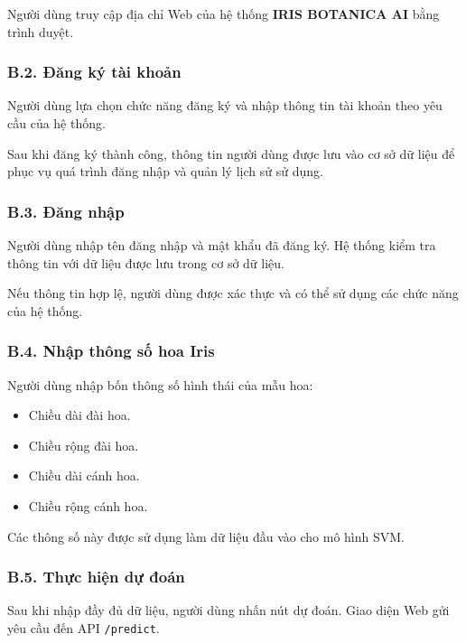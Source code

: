 \documentclass[14pt]{extarticle}
\begin{document}
	\noindent
	Người dùng truy cập địa chỉ Web của hệ thống
	\textbf{IRIS BOTANICA AI} bằng trình duyệt.
	
	\subsubsection*{B.2. Đăng ký tài khoản}
	
	\noindent
	Người dùng lựa chọn chức năng đăng ký và nhập thông tin tài khoản theo
	yêu cầu của hệ thống.
	
	\noindent
	Sau khi đăng ký thành công, thông tin người dùng được lưu vào cơ sở
	dữ liệu để phục vụ quá trình đăng nhập và quản lý lịch sử sử dụng.
	
	
	\subsubsection*{B.3. Đăng nhập}
	
	\noindent
	Người dùng nhập tên đăng nhập và mật khẩu đã đăng ký. Hệ thống kiểm tra
	thông tin với dữ liệu được lưu trong cơ sở dữ liệu.
	
	\noindent
	Nếu thông tin hợp lệ, người dùng được xác thực và có thể sử dụng các
	chức năng của hệ thống.
	
	\subsubsection*{B.4. Nhập thông số hoa Iris}
	
	\noindent
	Người dùng nhập bốn thông số hình thái của mẫu hoa:
	
	\begin{itemize}[leftmargin=*]
		\item Chiều dài đài hoa.
		\item Chiều rộng đài hoa.
		\item Chiều dài cánh hoa.
		\item Chiều rộng cánh hoa.
	\end{itemize}
	
	\noindent
	Các thông số này được sử dụng làm dữ liệu đầu vào cho mô hình SVM.
	
	
	\subsubsection*{B.5. Thực hiện dự đoán}
	
	\noindent
	Sau khi nhập đầy đủ dữ liệu, người dùng nhấn nút dự đoán. Giao diện Web
	gửi yêu cầu đến API \texttt{/predict}.
	
\end{document}
